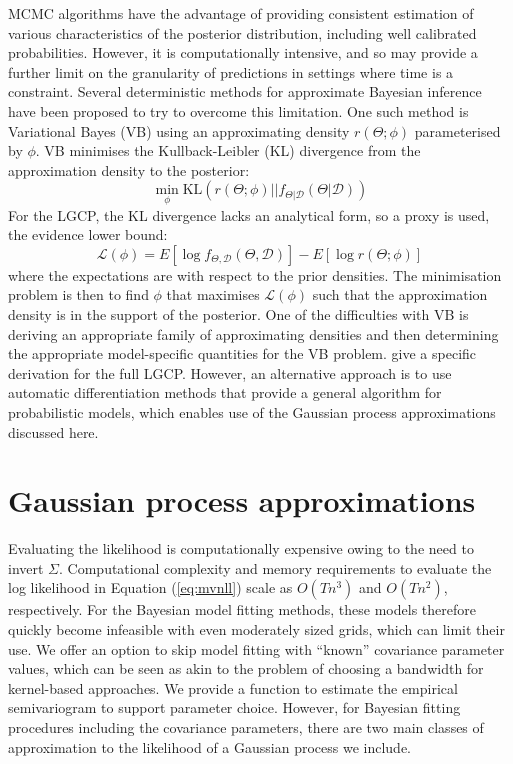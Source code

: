 MCMC algorithms have the advantage of providing consistent estimation of various characteristics of the posterior distribution, including well calibrated probabilities. However, it is computationally intensive, and so may provide a further limit on the granularity of predictions in settings where time is a constraint. Several deterministic methods for approximate Bayesian inference have been proposed to try to overcome this limitation. One such method is Variational Bayes (VB) using an approximating density $r(\Theta; \phi)$ parameterised by $\phi$. VB minimises the Kullback-Leibler (KL) divergence from the approximation density to the posterior:
\begin{equation*}
    \min_\phi \text{KL}(r(\Theta; \phi) \vert \vert f_{\Theta| \mathcal{D}}(\Theta| \mathcal{D}))
\end{equation*}
For the LGCP, the KL divergence lacks an analytical form, so a proxy is used, the evidence lower bound:
\begin{equation*}
    \mathcal{L}(\phi) = E\left[ \log f_{\Theta,\mathcal{D}}(\Theta,\mathcal{D}) \right] - E\left[ \log r(\Theta; \phi) \right]
\end{equation*}
where the expectations are with respect to the prior densities. The minimisation problem is then to find $\phi$ that maximises $\mathcal{L}(\phi)$ such that the approximation density is in the support of the posterior. One of the difficulties with VB is deriving an appropriate family of approximating densities and then determining the appropriate model-specific quantities for the VB problem. \citet{Teng2017} give a specific derivation for the full LGCP. However, an alternative approach is to use automatic differentiation methods that provide a general algorithm for probabilistic models, which enables use of the Gaussian process approximations discussed here. 

\section{Gaussian process approximations}
Evaluating the likelihood is computationally expensive owing to the need to invert $\Sigma$. Computational complexity and memory requirements to evaluate the log likelihood in Equation (\ref{eq:mvnll}) scale as $O(Tn^3)$ and $O(Tn^2)$, respectively. For the Bayesian model fitting methods, these models therefore quickly become infeasible with even moderately sized grids, which can limit their use. We offer an option to skip model fitting with ``known'' covariance parameter values, which can be seen as akin to the problem of choosing a bandwidth for kernel-based approaches. We provide a function to estimate the empirical semivariogram to support parameter choice. However, for Bayesian fitting procedures including the covariance parameters, there are two main classes of approximation to the likelihood of a Gaussian process we include. 

